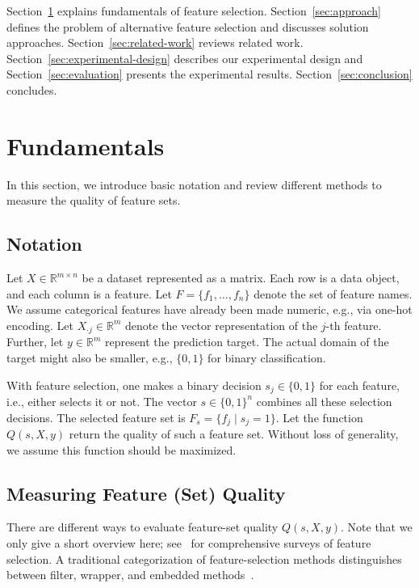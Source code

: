 \documentclass{article}
\theoremstyle{definition}
\begin{document}
Section~\ref{sec:fundamentals} explains fundamentals of feature selection.
Section~\ref{sec:approach} defines the problem of alternative feature selection and discusses solution approaches.
Section~\ref{sec:related-work} reviews related work.
Section~\ref{sec:experimental-design} describes our experimental design and Section~\ref{sec:evaluation} presents the experimental results.
Section~\ref{sec:conclusion} concludes.

\section{Fundamentals}
\label{sec:fundamentals}

In this section, we introduce basic notation and review different methods to measure the quality of feature sets.

\subsection{Notation}
\label{sec:fundamentals:notation}

Let $X \in \mathbb{R}^{m \times n}$ be a dataset represented as a matrix.
Each row is a data object, and each column is a feature.
Let $F = \{f_1, \dots, f_n\}$ denote the set of feature names.
We assume categorical features have already been made numeric, e.g., via one-hot encoding.
Let $X_{\cdot{}j} \in \mathbb{R}^m$ denote the vector representation of the $j$-th feature.
Further, let $y \in \mathbb{R}^m$ represent the prediction target.
The actual domain of the target might also be smaller, e.g., $\{0,1\}$ for binary classification.

With feature selection, one makes a binary decision $s_j \in \{0,1\}$ for each feature, i.e., either selects it or not.
The vector $s \in \{0,1\}^n$ combines all these selection decisions.
The selected feature set is $F_s = \{f_j \mid s_j=1\}$.
Let the function $Q(s,X,y)$ return the quality of such a feature set.
Without loss of generality, we assume this function should be maximized.

\subsection{Measuring Feature (Set) Quality}
\label{sec:fundamentals:quality}

There are different ways to evaluate feature-set quality $Q(s,X,y)$.
Note that we only give a short overview here; see~\cite{chandrashekar2014survey,li2017feature} for comprehensive surveys of feature selection.
A traditional categorization of feature-selection methods distinguishes between filter, wrapper, and embedded methods~\cite{guyon2003introduction}.
\end{document}
